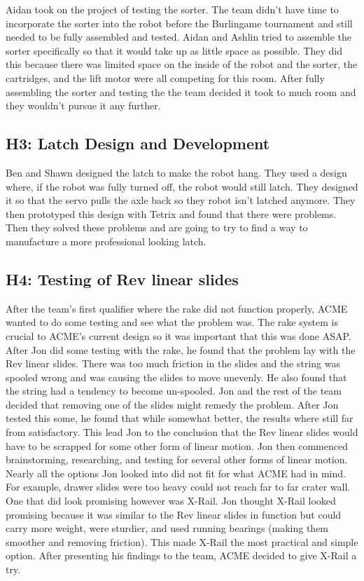 \documentclass{article}
\begin{document}
Aidan took on the project of testing the sorter. The team didn't have time to incorporate the sorter into the robot before the Burlingame tournament and still needed to be fully assembled and tested. Aidan and Ashlin tried to assemble the sorter specifically so that it would take up as little space as possible. They did this because there was limited space on the inside of the robot and the sorter, the cartridges, and the lift motor were all competing for this room. After fully assembling the sorter and testing the the team decided it took to much room and they wouldn't pursue it any further.

\subsection{H3: Latch Design and Development}

Ben and Shawn designed the latch to make the robot hang. They used a design where, if the robot was fully turned off, the robot would still latch. They designed it so that the servo pulls the axle back so they robot isn't latched anymore. They then prototyped this design with Tetrix and found that there were problems. Then they solved these problems and are going to try to find a way to manufacture a more professional looking latch.

\subsection{H4: Testing of Rev linear slides}

After the team's first qualifier where the rake did not function properly, ACME wanted to do some testing and see what the problem was. The rake system is crucial to ACME's current design so it was important that this was done ASAP. After Jon did some testing with the rake, he found that the problem lay with the Rev linear slides. There was too much friction in the slides and the string was spooled wrong and was causing the slides to move unevenly. He also found that the string had a tendency to become un-spooled. Jon and the rest of the team decided that removing one of the slides might remedy the problem. After Jon tested this some, he found that while somewhat better, the results where still far from satisfactory. This lead Jon to the conclusion that the Rev linear slides would have to be scrapped for some other form of linear motion. Jon then commenced brainstorming, researching, and testing for several other forms of linear motion. Nearly all the options Jon looked into did not fit for what ACME had in mind. For example, drawer slides were too heavy could not reach far to far crater wall. One that did look promising however was X-Rail. Jon thought X-Rail looked promising because it was similar to the Rev linear slides in function but could carry more weight, were sturdier, and used running bearings (making them smoother and removing friction). This made X-Rail the most practical and simple option. After presenting his findings to the team, ACME decided to give X-Rail a try. 
\end{document}
